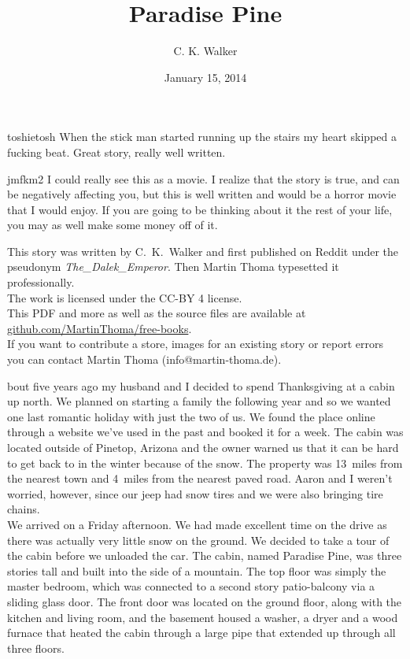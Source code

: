 \documentclass[a5paper]{scrartcl}
\title{Paradise Pine}
\author{C. K. Walker}
\date{January 15, 2014}
\begin{document}
\maketitle

\begin{shadequote}[l]{toshietosh}
When the stick man started running up the stairs my heart skipped a fucking beat. Great story, really well written.
\end{shadequote}

\begin{shadequote}[l]{jmfkm2}
I could really see this as a movie. I realize that the story is true, and can be negatively affecting you, but this is well written and would be a horror movie that I would enjoy. If you are going to be thinking about it the rest of your life, you may as well make some money off of it.
\end{shadequote}

\clearpage

This story was written by C.~K.~Walker and first published on Reddit under the
pseudonym \textit{The\_Dalek\_Emperor}. Then
Martin Thoma typesetted it professionally.\\

The work is licensed under the CC-BY 4 license.\\

This PDF and more as well as the source files are available at
\url{github.com/MartinThoma/free-books}.\\

If you want to contribute a store, images for an existing story or report
errors you can contact Martin Thoma (info@martin-thoma.de).

\clearpage

bout five years ago my husband and I decided to spend Thanksgiving at a cabin up north. We planned on starting a family the following year and so we wanted one last romantic holiday with just the two of us. We found the place online through a website we've used in the past and booked it for a week. The cabin was located outside of Pinetop, Arizona and the owner warned us that it can be hard to get back to in the winter because of the snow. The property was 13~miles from the nearest town and 4~miles from the nearest paved road. Aaron and I weren't worried, however, since our jeep had snow tires and we were also bringing tire chains. \\


We arrived on a Friday afternoon. We had made excellent time on the drive as there was actually very little snow on the ground. We decided to take a tour of the cabin before we unloaded the car. The cabin, named Paradise Pine, was three stories tall and built into the side of a mountain. The top floor was simply the master bedroom, which was connected to a second story patio-balcony via a sliding glass door. The front door was located on the ground floor, along with the kitchen and living room, and the basement housed a washer, a dryer and a wood furnace that heated the cabin through a large pipe that extended up through all three floors. \\
\end{document}
